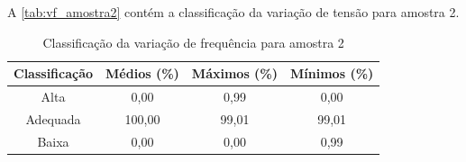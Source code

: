A \autoref{tab:vf_amostra2} contém a classificação da variação de tensão para amostra 2.

\begin{table}[H]
  \centering
  \caption{Classificação da variação de frequência para amostra 2}
  \label{tab:vf_amostra2}
  \begin{tabular}{@{}cccc@{}}
    \toprule
    Classificação & Médios (\%) & Máximos (\%) & Mínimos (\%) \\
    \midrule
    Alta & 0,00 & 0,99 & 0,00 \\
    Adequada & 100,00 & 99,01 & 99,01 \\
    Baixa & 0,00 & 0,00 & 0,99 \\
    \bottomrule
  \end{tabular}
\end{table}
